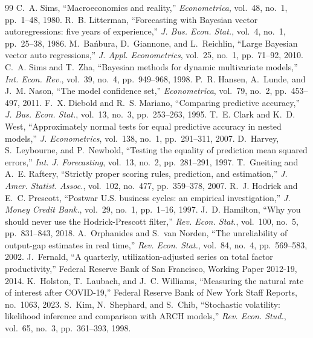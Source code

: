 \documentclass[conference]{IEEEtran}
\begin{document}
\begin{thebibliography}{99}
\small
{} C.~A. Sims, ``Macroeconomics and reality,'' \emph{Econometrica}, vol.~48, no.~1, pp.~1--48, 1980.
 R.~B. Litterman, ``Forecasting with Bayesian vector autoregressions: five years of experience,'' \emph{J. Bus. Econ. Stat.}, vol.~4, no.~1, pp.~25--38, 1986.
 M.~Ba\'nbura, D.~Giannone, and L.~Reichlin, ``Large Bayesian vector auto regressions,'' \emph{J. Appl. Econometrics}, vol.~25, no.~1, pp.~71--92, 2010.
 C.~A. Sims and T.~Zha, ``Bayesian methods for dynamic multivariate models,'' \emph{Int. Econ. Rev.}, vol.~39, no.~4, pp.~949--968, 1998.
 P.~R. Hansen, A.~Lunde, and J.~M. Nason, ``The model confidence set,'' \emph{Econometrica}, vol.~79, no.~2, pp.~453--497, 2011.
 F.~X. Diebold and R.~S. Mariano, ``Comparing predictive accuracy,'' \emph{J. Bus. Econ. Stat.}, vol.~13, no.~3, pp.~253--263, 1995.
 T.~E. Clark and K.~D. West, ``Approximately normal tests for equal predictive accuracy in nested models,'' \emph{J. Econometrics}, vol.~138, no.~1, pp.~291--311, 2007.
 D.~Harvey, S.~Leybourne, and P.~Newbold, ``Testing the equality of prediction mean squared errors,'' \emph{Int. J. Forecasting}, vol.~13, no.~2, pp.~281--291, 1997.
 T.~Gneiting and A.~E. Raftery, ``Strictly proper scoring rules, prediction, and estimation,'' \emph{J. Amer. Statist. Assoc.}, vol.~102, no.~477, pp.~359--378, 2007.
 R.~J. Hodrick and E.~C. Prescott, ``Postwar U.S. business cycles: an empirical investigation,'' \emph{J. Money Credit Bank.}, vol.~29, no.~1, pp.~1--16, 1997.
 J.~D. Hamilton, ``Why you should never use the Hodrick-Prescott filter,'' \emph{Rev. Econ. Stat.}, vol.~100, no.~5, pp.~831--843, 2018.
 A.~Orphanides and S.~van Norden, ``The unreliability of output-gap estimates in real time,'' \emph{Rev. Econ. Stat.}, vol.~84, no.~4, pp.~569--583, 2002.
 J.~Fernald, ``A quarterly, utilization-adjusted series on total factor productivity,'' Federal Reserve Bank of San Francisco, Working Paper 2012-19, 2014.
 K.~Holston, T.~Laubach, and J.~C. Williams, ``Measuring the natural rate of interest after COVID-19,'' Federal Reserve Bank of New York Staff Reports, no.~1063, 2023.
 S.~Kim, N.~Shephard, and S.~Chib, ``Stochastic volatility: likelihood inference and comparison with ARCH models,'' \emph{Rev. Econ. Stud.}, vol.~65, no.~3, pp.~361--393, 1998.

\end{thebibliography}
\end{document}

